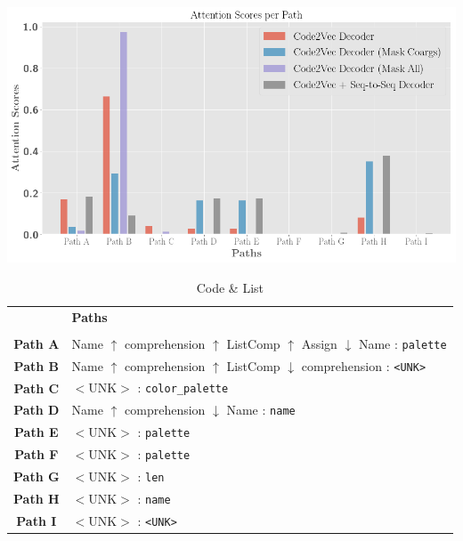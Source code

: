 \begin{table}[ht!]
\begin{center}

\includegraphics[width=0.9\linewidth]{ImagesCodeRelated/pretty_attention_XKCD.png}
\begingroup
    \fontsize{10pt}{12pt}\selectfont
\begin{tabular}{c l}
    & \textbf{Paths} \\
    \\
    \textbf{Path A} & Name $\uparrow$ comprehension $\uparrow$ ListComp $\uparrow$ Assign $\downarrow$ Name : \texttt{palette} \\
    \textbf{Path B} & Name $\uparrow$ comprehension $\uparrow$ ListComp $\downarrow$ comprehension : \texttt{<UNK>} \\
    \textbf{Path C} & $<$UNK$>$ : \texttt{color_palette} \\
    \textbf{Path D} & Name $\uparrow$ comprehension $\downarrow$ Name : \texttt{name} \\
    \textbf{Path E} & $<$UNK$>$ : \texttt{palette} \\
    \textbf{Path F} & $<$UNK$>$ : \texttt{palette} \\
    \textbf{Path G} & $<$UNK$>$ : \texttt{len} \\
    \textbf{Path H} & $<$UNK$>$ : \texttt{name} \\
    \textbf{Path I} & $<$UNK$>$ : \texttt{<UNK>} \\
\end{tabular}
\endgroup


\end{center}
\caption{Code \& List}
\label{fig:single_examples}
\end{table}


